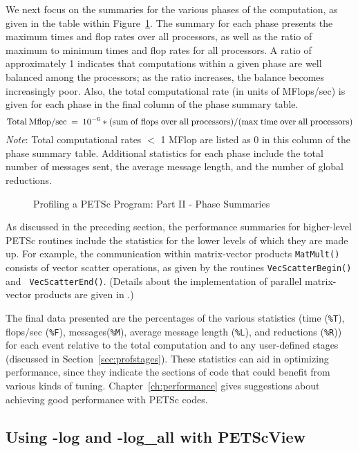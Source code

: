 We next focus on the summaries for the various phases of the
computation, as given in the table within Figure~\ref{fig:exparprof2}.  The summary for
each phase presents the maximum times and flop rates over all
processors, as well as the ratio of maximum to minimum times and flop
rates for all processors.  A ratio of approximately 1 indicates that
computations within a given phase are well balanced among the
processors; as the ratio increases, the balance becomes increasingly
poor.  Also, the total computational rate (in units of MFlops/sec) is
given for each phase in the final column of the phase summary table.
\[
   {\rm Total\: Mflop/sec} \:=\: 10^{-6} * ({\rm sum\; of\; flops\; over\; all\; processors})/({\rm max\; time\; over\; all\; processors})
\]
{\em Note}: Total computational rates $<$ 1 MFlop are listed as 0 in this column
of the phase summary table.
Additional statistics for each phase include the total number of messages sent,
the average message length, and the number of global reductions.

\begin{figure}[tb]
\centerline{}
\vspace{-2.5in}
\caption{Profiling a PETSc Program: Part II - Phase Summaries}
\label{fig:exparprof2}
\end{figure}

As discussed in the preceding section, the performance summaries for
higher-level PETSc routines include the statistics for the lower
levels of which they are made up.  For example, the communication within
matrix-vector products {\tt MatMult()} consists of vector scatter
operations, as given by the routines {\tt VecScatterBegin()} and {\tt
VecScatterEnd()}. (Details about the implementation of parallel
matrix-vector products are given in \cite{petsc-mpi-paper}.)

The final data presented are the percentages of the various statistics
(time ({\tt \%T}), flops/sec ({\tt \%F}), messages({\tt \%M}), average message length ({\tt \%L}),
and reductions ({\tt \%R})) for each event relative to the total computation and to any
user-defined stages (discussed in Section~\ref{sec:profstages}).
These statistics can aid in optimizing performance, since they indicate the sections of code that
could benefit from various kinds of tuning.  Chapter~\ref{ch:performance} gives
suggestions about achieving good performance with PETSc codes.

\subsection{Using -log and -log\_all with PETScView}
 

